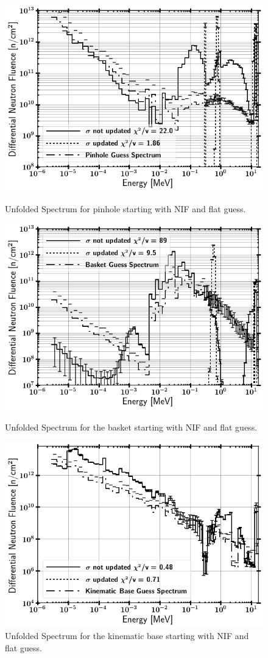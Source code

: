 \documentclass[journal]{IEEEtran}
\let\MYoriglatexcaption\caption
\renewcommand{\caption}[2][\relax]{\MYoriglatexcaption[#2]{#2}}
\begin{document}
\begin{figure}[t!]	
	\includegraphics[width=\linewidth]{Figures/Pin3.png}
	\caption{Unfolded Spectrum for pinhole starting with NIF and flat guess.}
	\label{fig:pin}
	\vskip 0.9cm
	\includegraphics[width=\linewidth]{Figures/Bask3.png}
	\caption{Unfolded Spectrum for the basket starting with NIF and flat guess.}
	\label{fig:bask}
	\vskip 0.9cm
	\includegraphics[width=\linewidth]{Figures/KBAS3.png}
	\caption{Unfolded Spectrum for the kinematic base starting with NIF and flat guess.}
	\label{fig:kbas}
\end{figure}
\end{document}
